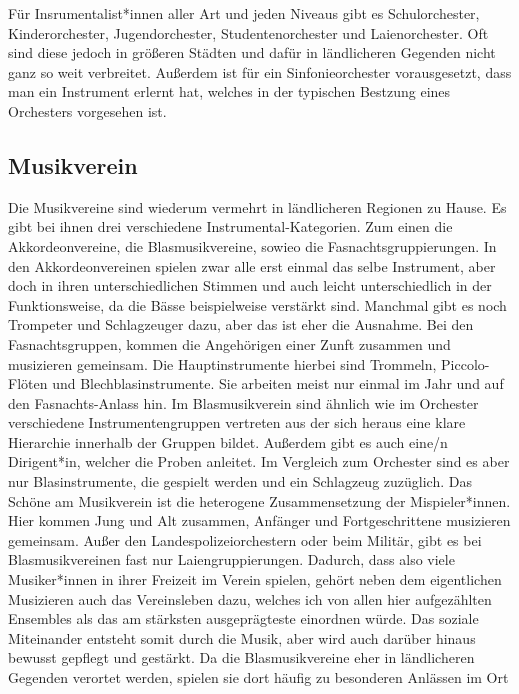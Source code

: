 Für Insrumentalist*innen aller Art und jeden Niveaus gibt es Schulorchester,
Kinderorchester, Jugendorchester, Studentenorchester und Laienorchester. Oft
sind diese jedoch in größeren Städten und dafür in ländlicheren Gegenden nicht
ganz so weit verbreitet. Außerdem ist für ein Sinfonieorchester vorausgesetzt,
dass man ein Instrument erlernt hat, welches in der typischen Bestzung eines
Orchesters vorgesehen ist. 



\subsection{Musikverein}

Die Musikvereine sind wiederum vermehrt in ländlicheren Regionen zu Hause. Es
gibt bei ihnen drei verschiedene Instrumental-Kategorien. Zum einen die
Akkordeonvereine, die Blasmusikvereine, sowieo die Fasnachtsgruppierungen. In
den Akkordeonvereinen spielen zwar alle erst einmal das selbe Instrument, aber
doch in ihren unterschiedlichen Stimmen und auch leicht unterschiedlich in der
Funktionsweise, da die Bässe beispielweise verstärkt sind. Manchmal gibt es noch
Trompeter und Schlagzeuger dazu, aber das ist eher die Ausnahme. Bei den
Fasnachtsgruppen, kommen die Angehörigen einer Zunft zusammen und musizieren
gemeinsam. Die Hauptinstrumente hierbei sind Trommeln, Piccolo-Flöten und
Blechblasinstrumente. Sie arbeiten meist nur einmal im Jahr und auf den
Fasnachts-Anlass hin. Im Blasmusikverein sind ähnlich wie im Orchester
verschiedene Instrumentengruppen vertreten aus der sich heraus eine klare
Hierarchie innerhalb der Gruppen bildet. Außerdem gibt es auch eine/n
Dirigent*in, welcher die Proben anleitet. Im Vergleich zum Orchester sind es
aber nur Blasinstrumente, die gespielt werden und ein Schlagzeug zuzüglich. Das
Schöne am Musikverein ist die heterogene Zusammensetzung der Mispieler*innen.
Hier kommen Jung und Alt zusammen, Anfänger und Fortgeschrittene musizieren
gemeinsam. Außer den Landespolizeiorchestern oder beim Militär, gibt es bei
Blasmusikvereinen fast nur Laiengruppierungen. Dadurch, dass also viele
Musiker*innen in ihrer Freizeit im Verein spielen, gehört neben dem eigentlichen
Musizieren auch das Vereinsleben dazu, welches ich von allen hier aufgezählten
Ensembles als das am stärksten ausgeprägteste einordnen würde. Das soziale
Miteinander entsteht somit durch die Musik, aber wird auch darüber hinaus
bewusst gepflegt und gestärkt. Da die Blasmusikvereine eher in ländlicheren
Gegenden verortet werden, spielen sie dort häufig zu besonderen Anlässen im Ort
